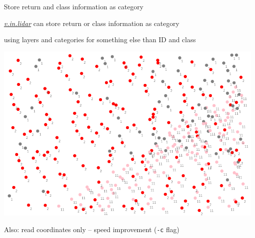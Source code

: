 \documentclass[xcolor={dvipsnames,usenames},beamer,aspectratio=1610]{beamer}
\newcommand{\gmodule}[1]{\href{http://grass.osgeo.org/grass71/manuals/#1.html}{\emph{#1}}}
\begin{document}
\begin{frame}{Store return and class information as category}

\gmodule{v.in.lidar} can store return or class information as category

{\small using layers and categories for something else than ID and class}


\begin{center}
\includegraphics[height=0.6\textheight]{images/features/class_as_cat}
\end{center}

Also: read coordinates only -- speed improvement (\texttt{-c} flag)

\end{frame}
\end{document}

